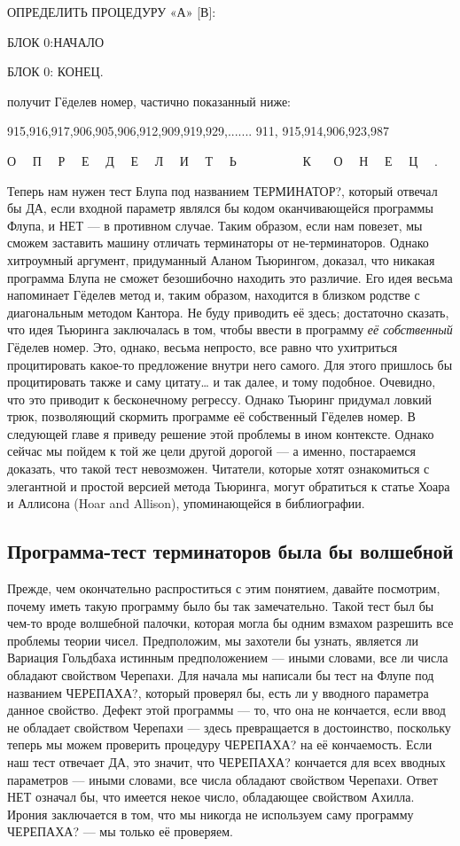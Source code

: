 \documentclass[../main.tex]{subfiles}
\begin{document}
ОПРЕДЕЛИТЬ ПРОЦЕДУРУ «А» {[}В{]}:

БЛОК 0:НАЧАЛО

БЛОК 0: КОНЕЦ.

получит Гёделев номер, частично показанный ниже:

915,916,917,906,905,906,912,909,919,929,....... 911, 915,914,906,923,987

О~~ П~~ Р~~ Е~~ Д~~ Е~~ Л~~ И~~ Т~~ Ь~~~~~~~~~~ К~~~ О~~ Н~~ Е~~ Ц~~ .

Теперь нам нужен тест Блупа под названием ТЕРМИНАТОР?, который отвечал бы ДА, если входной параметр являлся бы кодом оканчивающейся программы Флупа, и НЕТ --- в противном случае. Таким образом, если нам повезет, мы сможем заставить машину отличать терминаторы от не-терминаторов. Однако хитроумный аргумент, придуманный Аланом Тьюрингом, доказал, что никакая программа Блупа не сможет безошибочно находить это различие. Его идея весьма напоминает Гёделев метод и, таким образом, находится в близком родстве с диагональным методом Кантора. Не буду приводить её здесь; достаточно сказать, что идея Тьюринга заключалась в том, чтобы ввести в программу \emph{её собственный} Гёделев номер. Это, однако, весьма непросто, все равно что ухитриться процитировать какое-то предложение внутри него самого. Для этого пришлось бы процитировать также и саму цитату\ldots{} и так далее, и тому подобное. Очевидно, что это приводит к бесконечному регрессу. Однако Тьюринг придумал ловкий трюк, позволяющий скормить программе её собственный Гёделев номер. В следующей главе я приведу решение этой проблемы в ином контексте. Однако сейчас мы пойдем к той же цели другой дорогой --- а именно, постараемся доказать, что такой тест невозможен. Читатели, которые хотят ознакомиться с элегантной и простой версией метода Тьюринга, могут обратиться к статье Хоара и Аллисона (Hoar and Allison), упоминающейся в библиографии.


\subsection{Программа-тест терминаторов была бы волшебной}

Прежде, чем окончательно распроститься с этим понятием, давайте посмотрим, почему иметь такую программу было бы так замечательно. Такой тест был бы чем-то вроде волшебной палочки, которая могла бы одним взмахом разрешить все проблемы теории чисел. Предположим, мы захотели бы узнать, является ли Вариация Гольдбаха истинным предположением --- иными словами, все ли числа обладают свойством Черепахи. Для начала мы написали бы тест на Флупе под названием ЧЕРЕПАХА?, который проверял бы, есть ли у вводного параметра данное свойство. Дефект этой программы --- то, что она не кончается, если ввод не обладает свойством Черепахи --- здесь превращается в достоинство, поскольку теперь мы можем проверить процедуру ЧЕРЕПАХА? на её кончаемость. Если наш тест отвечает ДА, это значит, что ЧЕРЕПАХА? кончается для всех вводных параметров --- иными словами, все числа обладают свойством Черепахи. Ответ НЕТ означал бы, что имеется некое число, обладающее свойством Ахилла. Ирония заключается в том, что мы никогда не используем саму программу ЧЕРЕПАХА? --- мы только её проверяем.
\end{document}
